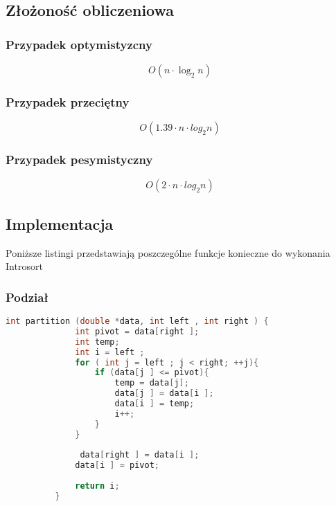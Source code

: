 \documentclass[12pt]{article}
\begin{document}
\subsection{Złożoność obliczeniowa}
\subsubsection{Przypadek optymistyzcny}

{ \Large \begin{equation*}
       O(n \cdot \log_2 n)  
\end{equation*}}
\subsubsection{Przypadek przeciętny}

{ \Large \begin{equation*}
       O( 1.39 \cdot n \cdot log_2 n)   
\end{equation*}}

\subsubsection{Przypadek pesymistyczny}

{ \Large \begin{equation*}
       O(2 \cdot n \cdot log_2 n)   
\end{equation*}}

\subsection{Implementacja}

Poniższe listingi przedstawiają poszczególne funkcje konieczne do wykonania Introsort

\subsubsection{Podział}

{\small
\begin{lstlisting}[language=C++]
       int partition (double *data, int left , int right ) {
              int pivot = data[right ];
              int temp;
              int i = left ;
              for ( int j = left ; j < right; ++j){
                  if (data[j ] <= pivot){
                      temp = data[j];
                      data[j ] = data[i ];
                      data[i ] = temp;
                      i++;
                  }
              }
          
               data[right ] = data[i ];
              data[i ] = pivot;
          
              return i;
          }
       \end{lstlisting}

}
\end{document}
